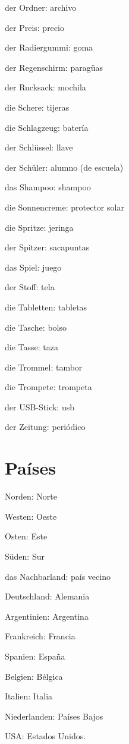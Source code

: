 \begin{multicols}{3}
\begin{myitemize}
\item der Ordner: archivo
\item der Preis: precio
\item der Radiergummi: goma
\item der Regenschirm: paragüas
\item der Rucksack: mochila
\item die Schere: tijeras
\item die Schlagzeug: batería
\item der Schlüssel: llave
\item der Schüler: alumno (de escuela)
\item das Shampoo: shampoo
\item die Sonnencreme: protector solar
\item die Spritze: jeringa
\item der Spitzer: sacapuntas
\item das Spiel: juego
\item der Stoff: tela
\item die Tabletten: tabletas
\item die Tasche: bolso
\item die Tasse: taza
\item die Trommel: tambor
\item die Trompete: trompeta
\item der USB-Stick: usb
\item der Zeitung: periódico
\end{myitemize}
\end{multicols}

\section{Países}
\begin{multicols}{3}
\begin{myitemize}
\item Norden: Norte
\item Westen: Oeste
\item Osten: Este
\item Süden: Sur
\item das Nachbarland: país vecino
\item Deutschland: Alemania
\item Argentinien: Argentina
\item Frankreich: Francia
\item Spanien: España
\item Belgien: Bélgica
\item Italien: Italia
\item Niederlanden: Países Bajos
\item USA: Estados Unidos.
\end{myitemize}
\end{multicols}


